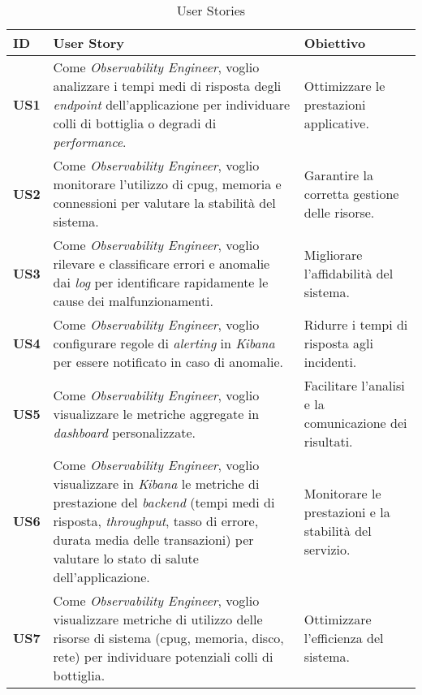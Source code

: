 \begin{longtable}{|p{1cm}|p{8cm}|p{3cm}|}
\caption{User Stories}
\label{tab:user-stories} \\
\hline
\rowcolor[gray]{0.8}
\textbf{ID} & \textbf{User Story} & \textbf{Obiettivo} \\
\hline
\endfirsthead

\hline
\textbf{US1} & Come \emph{Observability Engineer}, voglio analizzare i tempi medi di risposta degli \emph{endpoint} dell'applicazione per individuare colli di bottiglia o degradi di \emph{performance}. & Ottimizzare le prestazioni applicative. \\
\hline

\textbf{US2} & Come \emph{Observability Engineer}, voglio monitorare l'utilizzo di \gls{cpug}, memoria e connessioni per valutare la stabilità del sistema. & Garantire la corretta gestione delle risorse. \\
\hline

\textbf{US3} & Come \emph{Observability Engineer}, voglio rilevare e classificare errori e anomalie dai \emph{log} per identificare rapidamente le cause dei malfunzionamenti. & Migliorare l'affidabilità del sistema. \\
\hline

\textbf{US4} & Come \emph{Observability Engineer}, voglio configurare regole di \emph{alerting} in \emph{Kibana} per essere notificato in caso di anomalie. & Ridurre i tempi di risposta agli incidenti. \\
\hline

\textbf{US5} & Come \emph{Observability Engineer}, voglio visualizzare le metriche aggregate in \emph{dashboard} personalizzate. & Facilitare l'analisi e la comunicazione dei risultati. \\
\hline

\textbf{US6} & Come \emph{Observability Engineer}, voglio visualizzare in \emph{Kibana} le metriche di prestazione del \emph{backend} (tempi medi di risposta, \emph{throughput}, tasso di errore, durata media delle transazioni) per valutare lo stato di salute dell'applicazione. & Monitorare le prestazioni e la stabilità del servizio. \\
\hline

\textbf{US7} & Come \emph{Observability Engineer}, voglio visualizzare metriche di utilizzo delle risorse di sistema (\gls{cpug}, memoria, disco, rete) per individuare potenziali colli di bottiglia. & Ottimizzare l'efficienza del sistema. \\
\hline


\end{longtable}
